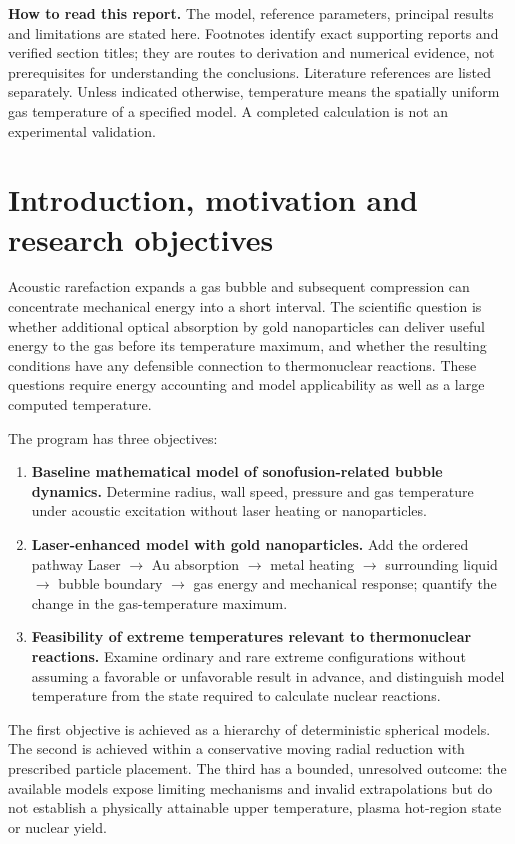 \documentclass[11pt,a4paper]{article}
\begin{document}
\clearpage
\tableofcontents
\vfill
\textbf{How to read this report.} The model, reference parameters, principal results and limitations are stated here. Footnotes identify exact supporting reports and verified section titles; they are routes to derivation and numerical evidence, not prerequisites for understanding the conclusions. Literature references are listed separately. Unless indicated otherwise, temperature means the spatially uniform gas temperature of a specified model. A completed calculation is not an experimental validation.
\clearpage
\section{Introduction, motivation and research objectives}
Acoustic rarefaction expands a gas bubble and subsequent compression can concentrate mechanical energy into a short interval. The scientific question is whether additional optical absorption by gold nanoparticles can deliver useful energy to the gas before its temperature maximum, and whether the resulting conditions have any defensible connection to thermonuclear reactions. These questions require energy accounting and model applicability as well as a large computed temperature.

The program has three objectives:
\begin{enumerate}
\item \textbf{Baseline mathematical model of sonofusion-related bubble dynamics.} Determine radius, wall speed, pressure and gas temperature under acoustic excitation without laser heating or nanoparticles.
\item \textbf{Laser-enhanced model with gold nanoparticles.} Add the ordered pathway Laser $\to$ Au absorption $\to$ metal heating $\to$ surrounding liquid $\to$ bubble boundary $\to$ gas energy and mechanical response; quantify the change in the gas-temperature maximum.
\item \textbf{Feasibility of extreme temperatures relevant to thermonuclear reactions.} Examine ordinary and rare extreme configurations without assuming a favorable or unfavorable result in advance, and distinguish model temperature from the state required to calculate nuclear reactions.
\end{enumerate}

The first objective is achieved as a hierarchy of deterministic spherical models. The second is achieved within a conservative moving radial reduction with prescribed particle placement. The third has a bounded, unresolved outcome: the available models expose limiting mechanisms and invalid extrapolations but do not establish a physically attainable upper temperature, plasma hot-region state or nuclear yield.
\end{document}
